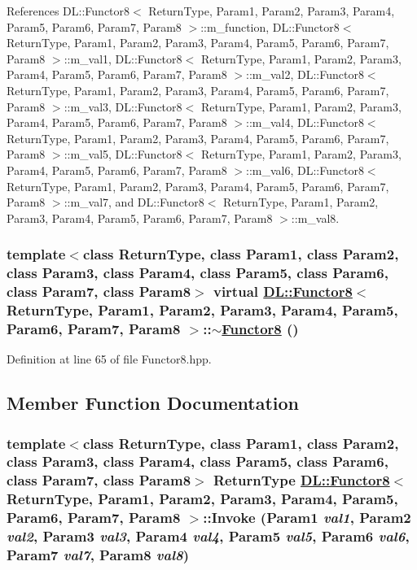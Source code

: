 References DL::Functor8$<$ Return\-Type, Param1, Param2, Param3, Param4, Param5, Param6, Param7, Param8 $>$::m\_\-function, DL::Functor8$<$ Return\-Type, Param1, Param2, Param3, Param4, Param5, Param6, Param7, Param8 $>$::m\_\-val1, DL::Functor8$<$ Return\-Type, Param1, Param2, Param3, Param4, Param5, Param6, Param7, Param8 $>$::m\_\-val2, DL::Functor8$<$ Return\-Type, Param1, Param2, Param3, Param4, Param5, Param6, Param7, Param8 $>$::m\_\-val3, DL::Functor8$<$ Return\-Type, Param1, Param2, Param3, Param4, Param5, Param6, Param7, Param8 $>$::m\_\-val4, DL::Functor8$<$ Return\-Type, Param1, Param2, Param3, Param4, Param5, Param6, Param7, Param8 $>$::m\_\-val5, DL::Functor8$<$ Return\-Type, Param1, Param2, Param3, Param4, Param5, Param6, Param7, Param8 $>$::m\_\-val6, DL::Functor8$<$ Return\-Type, Param1, Param2, Param3, Param4, Param5, Param6, Param7, Param8 $>$::m\_\-val7, and DL::Functor8$<$ Return\-Type, Param1, Param2, Param3, Param4, Param5, Param6, Param7, Param8 $>$::m\_\-val8.\hypertarget{classDL_1_1Functor8_a1}{
\subsubsection[$\sim$Functor8]{\setlength{\rightskip}{0pt plus 5cm}template$<$class Return\-Type, class Param1, class Param2, class Param3, class Param4, class Param5, class Param6, class Param7, class Param8$>$ virtual \hyperlink{classDL_1_1Functor8}{DL::Functor8}$<$ Return\-Type, Param1, Param2, Param3, Param4, Param5, Param6, Param7, Param8 $>$::$\sim$\hyperlink{classDL_1_1Functor8}{Functor8} ()}}
\label{classDL_1_1Functor8_a1}




Definition at line 65 of file Functor8.hpp.

\subsection{Member Function Documentation}
\hypertarget{classDL_1_1Functor8_a3}{
\subsubsection[Invoke]{\setlength{\rightskip}{0pt plus 5cm}template$<$class Return\-Type, class Param1, class Param2, class Param3, class Param4, class Param5, class Param6, class Param7, class Param8$>$ Return\-Type \hyperlink{classDL_1_1Functor8}{DL::Functor8}$<$ Return\-Type, Param1, Param2, Param3, Param4, Param5, Param6, Param7, Param8 $>$::Invoke (Param1 {\em val1}, Param2 {\em val2}, Param3 {\em val3}, Param4 {\em val4}, Param5 {\em val5}, Param6 {\em val6}, Param7 {\em val7}, Param8 {\em val8})}}
\label{classDL_1_1Functor8_a3}




